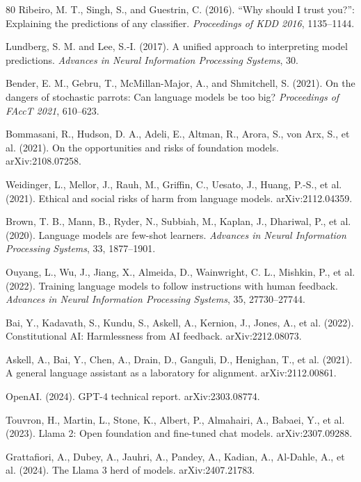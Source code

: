 \documentclass[11pt,a4paper]{article}
\begin{document}
\begin{thebibliography}{80}
Ribeiro, M. T., Singh, S., and Guestrin, C. (2016). ``Why should I trust you?'': Explaining the predictions of any classifier. \textit{Proceedings of KDD 2016}, 1135--1144.

Lundberg, S. M. and Lee, S.-I. (2017). A unified approach to interpreting model predictions. \textit{Advances in Neural Information Processing Systems}, 30.

Bender, E. M., Gebru, T., McMillan-Major, A., and Shmitchell, S. (2021). On the dangers of stochastic parrots: Can language models be too big? \textit{Proceedings of FAccT 2021}, 610--623.

Bommasani, R., Hudson, D. A., Adeli, E., Altman, R., Arora, S., von Arx, S., et al. (2021). On the opportunities and risks of foundation models. arXiv:2108.07258.

Weidinger, L., Mellor, J., Rauh, M., Griffin, C., Uesato, J., Huang, P.-S., et al. (2021). Ethical and social risks of harm from language models. arXiv:2112.04359.

Brown, T. B., Mann, B., Ryder, N., Subbiah, M., Kaplan, J., Dhariwal, P., et al. (2020). Language models are few-shot learners. \textit{Advances in Neural Information Processing Systems}, 33, 1877--1901.

Ouyang, L., Wu, J., Jiang, X., Almeida, D., Wainwright, C. L., Mishkin, P., et al. (2022). Training language models to follow instructions with human feedback. \textit{Advances in Neural Information Processing Systems}, 35, 27730--27744.

Bai, Y., Kadavath, S., Kundu, S., Askell, A., Kernion, J., Jones, A., et al. (2022). Constitutional AI: Harmlessness from AI feedback. arXiv:2212.08073.

Askell, A., Bai, Y., Chen, A., Drain, D., Ganguli, D., Henighan, T., et al. (2021). A general language assistant as a laboratory for alignment. arXiv:2112.00861.

OpenAI. (2024). GPT-4 technical report. arXiv:2303.08774.

Touvron, H., Martin, L., Stone, K., Albert, P., Almahairi, A., Babaei, Y., et al. (2023). Llama 2: Open foundation and fine-tuned chat models. arXiv:2307.09288.

Grattafiori, A., Dubey, A., Jauhri, A., Pandey, A., Kadian, A., Al-Dahle, A., et al. (2024). The Llama 3 herd of models. arXiv:2407.21783.


\end{thebibliography}
\end{document}
